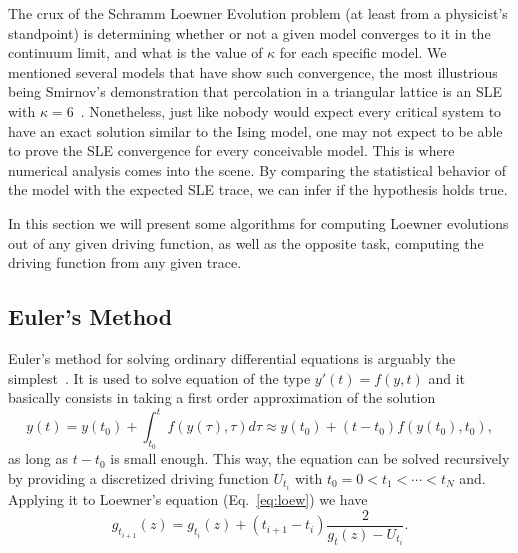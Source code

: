 The crux of the Schramm Loewner Evolution problem (at least from a physicist's
standpoint) is determining whether or not a given model converges to it in the
continuum limit, and what is the value of $\kappa$ for each specific model. We
mentioned several models that have show such convergence, the most illustrious
being Smirnov's demonstration that percolation in a triangular lattice is an
SLE with $\kappa=6$~\cite{Smirnov2001b}. Nonetheless, just like nobody would
expect every critical system to have an exact solution similar to the Ising
model, one may not expect to be able to prove the SLE convergence for every
conceivable model. This is where numerical analysis comes into the scene. By
comparing the statistical behavior of the model with the expected SLE trace, we
can infer if the hypothesis holds true.

In this section we will present some algorithms for computing Loewner
evolutions out of any given driving function, as well as the opposite task,
computing the driving function from any given trace.


\subsection{Euler's Method}
\label{ss:euler}

Euler's method for solving ordinary differential equations is arguably the
simplest~\cite{Press2007}. It is used to solve equation of the type $y'(t) =
f(y, t)$ and it basically consists in taking a first order approximation of the
solution
\begin{equation}
    \newcommand{\y}[1]{y\left(#1\right)}
    \newcommand{\f}[1]{f\left(#1\right)}
    \y{t} = \y{t_0} + \int_{t_0}^t \f{\y{\tau}, \tau} d\tau \approx
            \y{t_0} + \left(t - t_0\right)\f{\y{t_0}, t_0},
\end{equation}
as long as $t - t_0$ is small enough. This way, the equation can be solved
recursively by providing a discretized driving function $U_{t_i}$ with $t_0 =
0 < t_{1}<\cdots<t_N$ and. Applying it to Loewner's equation
(Eq.~\ref{eq:loew}) we have
\begin{equation}
    g_{t_{i+1}}(z) = g_{t_i}(z) + (t_{i+1} - t_i) \frac{2}{g_t(z) - U_{t_i}}.
\end{equation}

